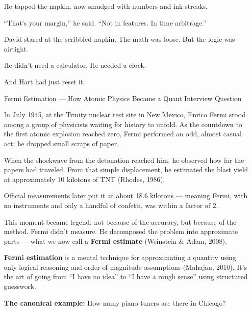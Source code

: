 He tapped the napkin, now smudged with numbers and ink streaks.

``That’s your margin,'' he said. ``Not in features. In time arbitrage.''

David stared at the scribbled napkin. The math was loose. But the logic was airtight.

He didn’t need a calculator. He needed a clock.

And Hart had just reset it.

\medskip


\begin{HistoricalSidebar}{Fermi Estimation --- How Atomic Physics Became a Quant Interview Question}

    In July 1945, at the Trinity nuclear test site in New Mexico, Enrico Fermi stood among a group of physicists waiting for 
    history to unfold.  
    As the countdown to the first atomic explosion reached zero, Fermi performed an odd, almost casual act: he dropped small 
    scraps of paper.
  
    \medskip
  
    When the shockwave from the detonation reached him, he observed how far the papers had traveled.  
    From that simple displacement, he estimated the blast yield at approximately 10 kilotons of TNT (Rhodes, 1986).  
  
    \medskip
  
    Official measurements later put it at about 18.6 kilotons — meaning Fermi, with no instruments and only a handful of confetti, 
    was within a factor of 2.
  
    \medskip
  
    This moment became legend: not because of the accuracy, but because of the method.  
    Fermi didn’t measure. He decomposed the problem into approximate parts — what we now call a \textbf{Fermi estimate} 
    (Weinstein \& Adam, 2008).
  
    \medskip
  
    \textbf{Fermi estimation} is a mental technique for approximating a quantity using only logical reasoning and 
    order-of-magnitude assumptions (Mahajan, 2010).  
    It’s the art of going from ``I have no idea'' to ``I have a rough sense'' using structured guesswork.
  
    \medskip
  
    \textbf{The canonical example:}  
    How many piano tuners are there in Chicago?
  
    \medskip
  

\end{HistoricalSidebar}
